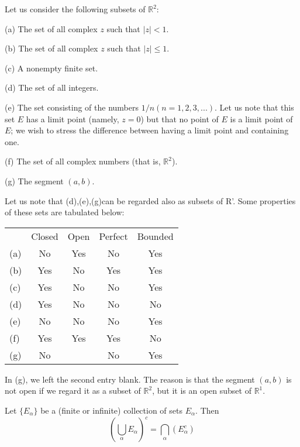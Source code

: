 \begin{myExample}
    \label{myExample:2.21}
    Let us consider the following subsets of $\mathbb{R}^2$:

(a) The set of all complex $z$ such that $|z| < 1$.

(b) The set of all complex $z$ such that $|z| \leq 1$.

(c) A nonempty finite set.

(d) The set of all integers.

(e) The set consisting of the numbers $1/n(n=1,2,3,...)$. Let us note that this set $E$ has a limit point (namely, $z =0$) but that no point of $E$ is a limit point of $E$; we wish to stress the difference between having a limit point and containing one.

(f) The set of all complex numbers (that is, $\mathbb{R}^2$).

(g) The segment $(a,b)$.
\end{myExample}

Let us note that (d),(e),(g)can be regarded also as subsets of R'.
Some properties of these sets are tabulated below:


\begin{table}[htbp]
    \begin{center}
    \begin{tabular}{lcccc}
        & Closed & Open & Perfect & Bounded \\
    (a) & No     & Yes  & No      & Yes     \\
    (b) & Yes    & No   & Yes     & Yes     \\
    (c) & Yes    & No   & No      & Yes     \\
    (d) & Yes    & No   & No      & No      \\
    (e) & No     & No   & No      & Yes     \\
    (f) & Yes    & Yes  & Yes     & No      \\
    (g) & No     &      & No      & Yes    
    \end{tabular}
    \end{center}
\end{table}

In (g), we left the second entry blank. The reason is that the segment $(a,b)$ is not open if we regard it as a subset of $\mathbb{R}^2$, but it is an open subset of $\mathbb{R}^1$.


\begin{thm}
    \label{thm:2.22}
    Let $\{E_\alpha\}$ be a (finite or infinite) collection of sets $E_\alpha$. Then
    \begin{equation}
        \left(\bigcup_{\alpha} E_{\alpha} \right)^c = \bigcap_{\alpha}( E_{\alpha}^c )
    \end{equation}
\end{thm}

